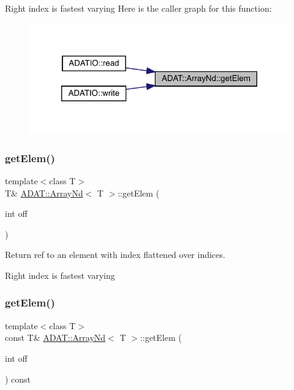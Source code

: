 Right index is fastest varying Here is the caller graph for this function\+:\nopagebreak
\begin{figure}[H]
\begin{center}
\leavevmode
\includegraphics[width=320pt]{d1/db2/classADAT_1_1ArrayNd_abc5c56420a9625b236d4521acb083de2_icgraph}
\end{center}
\end{figure}
\mbox{\label{classADAT_1_1ArrayNd_abc5c56420a9625b236d4521acb083de2}} 
\subsubsection{\texorpdfstring{getElem()}{getElem()}\hspace{0.1cm}{\footnotesize\ttfamily [2/4]}}
{\footnotesize\ttfamily template$<$class T$>$ \\
T\& \mbox{\hyperlink{classADAT_1_1ArrayNd}{A\+D\+A\+T\+::\+Array\+Nd}}$<$ T $>$\+::get\+Elem (\begin{DoxyParamCaption}\item[{int}]{off }\end{DoxyParamCaption})\hspace{0.3cm}{\ttfamily [inline]}}



Return ref to an element with index flattened over indices. 

Right index is fastest varying \mbox{\label{classADAT_1_1ArrayNd_a515368f71387996ee237309eb1f0cc2e}} 
\subsubsection{\texorpdfstring{getElem()}{getElem()}\hspace{0.1cm}{\footnotesize\ttfamily [3/4]}}
{\footnotesize\ttfamily template$<$class T$>$ \\
const T\& \mbox{\hyperlink{classADAT_1_1ArrayNd}{A\+D\+A\+T\+::\+Array\+Nd}}$<$ T $>$\+::get\+Elem (\begin{DoxyParamCaption}\item[{int}]{off }\end{DoxyParamCaption}) const\hspace{0.3cm}{\ttfamily [inline]}}



